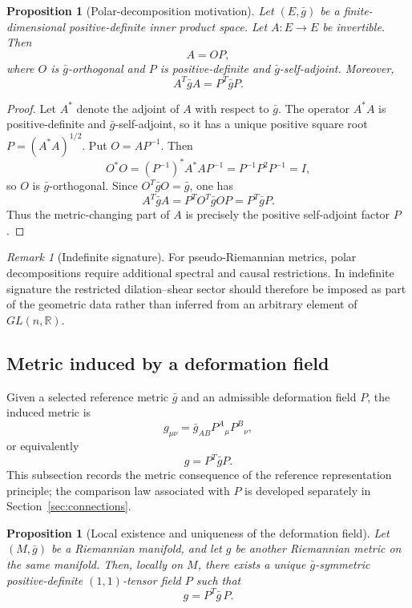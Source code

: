 \documentclass[12pt]{amsart}
\newtheorem{proposition}[theorem]{Proposition}
\theoremstyle{definition}
\theoremstyle{remark}
\newtheorem{remark}[theorem]{Remark}
\begin{document}
\begin{proposition}[Polar-decomposition motivation]
Let $(E,\bar g)$ be a finite-dimensional positive-definite inner product space.  Let \(A\colon E\to E\) be invertible.  Then
\[
 A=OP,
\]
where $O$ is $\bar g$-orthogonal and $P$ is positive-definite and $\bar g$-self-adjoint.  Moreover,
\[
 A^T\bar g A=P^T\bar g P.
\]
\end{proposition}

\begin{proof}
Let $A^*$ denote the adjoint of $A$ with respect to $\bar g$.  The operator $A^*A$ is positive-definite and $\bar g$-self-adjoint, so it has a unique positive square root $P=(A^*A)^{1/2}$.  Put $O=AP^{-1}$.  Then
\[
 O^*O=(P^{-1})^*A^*AP^{-1}=P^{-1}P^2P^{-1}=I,
\]
so $O$ is $\bar g$-orthogonal.  Since $O^T\bar g O=\bar g$, one has
\[
 A^T\bar g A=P^TO^T\bar g OP=P^T\bar g P.
\]
Thus the metric-changing part of $A$ is precisely the positive self-adjoint factor $P$.
\end{proof}

\begin{remark}[Indefinite signature]
For pseudo-Riemannian metrics, polar decompositions require additional spectral and causal restrictions.  In indefinite signature the restricted dilation--shear sector should therefore be imposed as part of the geometric data rather than inferred from an arbitrary element of $GL(n,\mathbb R)$.
\end{remark}

\subsection{Metric induced by a deformation field}\label{subsec:deformed_metric}

Given a selected reference metric \(\bar g\) and an admissible deformation field \(P\), the induced metric is
\begin{equation}\label{eq:metric_components}
 g_{\mu\nu}=\bar g_{AB}P^{A}{}_{\mu}P^{B}{}_{\nu},
\end{equation}
or equivalently
\begin{equation}\label{eq:metric_law}
 g=P^{T}\bar g P .
\end{equation}
This subsection records the metric consequence of the reference representation principle; the comparison law associated with \(P\) is developed separately in Section~\ref{sec:connections}.

\begin{proposition}[Local existence and uniqueness of the deformation field]
Let $(M,\bar g)$ be a Riemannian manifold, and let $g$ be another Riemannian metric on the same manifold. Then, locally on $M$, there exists a unique $\bar g$-symmetric positive-definite $(1,1)$-tensor field $P$ such that
\[
 g=P^T\bar g\,P .
\]
\end{proposition}
\end{document}

